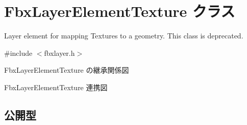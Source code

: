 \hypertarget{class_fbx_layer_element_texture}{}\section{Fbx\+Layer\+Element\+Texture クラス}
\label{class_fbx_layer_element_texture}


Layer element for mapping Textures to a geometry. This class is deprecated.  




{\ttfamily \#include $<$fbxlayer.\+h$>$}



Fbx\+Layer\+Element\+Texture の継承関係図


Fbx\+Layer\+Element\+Texture 連携図
\subsection*{公開型}
